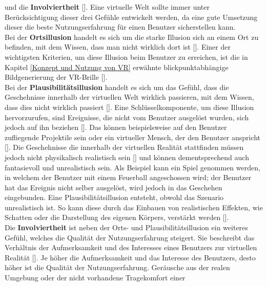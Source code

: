 \documentclass[a4paper,12pt,oneside]{article}
\begin{document}
        und die \textbf{Involviertheit} [\cite[18-19]{Dorner2013}]. Eine virtuelle Welt sollte immer unter
        Berücksichtigung dieser drei Gefühle entwickelt werden, da eine gute Umsetzung
        dieser die beste Nutzungserfahrung für einen Benutzer sicherstellen kann. \\
        Bei der 
        \textbf{Ortsillusion} handelt es sich um die starke Illusion sich an einem Ort zu befinden, 
        mit dem Wissen, dass man nicht wirklich dort ist [\cite{Slater2009}]. 
        Einer der wichtigsten
        Kriterien, um diese Illusion beim Benutzer zu erreichen, ist die in Kapitel 
        \ref{Konzept und Nutzung von VR}
        erwähnte blickpunktabhängige Bildgenerierung der VR-Brille [\cite[18]{Dorner2013}]. \\
        Bei der \textbf{Plausibilitätsillusion} handelt
        es sich um das Gefühl, dass die Geschehnisse innerhalb der virtuellen Welt 
        wirklich passieren, mit dem Wissen, dass dies nicht wirklich passiert
        [\cite{Slater2009}]. Eine Schlüsselkomponente, um diese Illusion hervorzurufen,
        sind Ereignisse, die nicht vom Benutzer ausgelöst wurden, sich jedoch auf ihn
        beziehen [\cite{Slater2009}]. Das können beispielsweise auf den Benutzer zufliegende
        Projektile sein oder ein virtueller Mensch, der den Benutzer anspricht
        [\cite[18-19]{Dorner2013}]. Die Geschehnisse die innerhalb der virtuellen Realität
        stattfinden müssen jedoch nicht physikalisch realistisch sein [\cite{Slater2009}]
        und können dementsprechend auch fantasievoll und unrealistisch sein. Als Beispiel kann
        ein Spiel genommen werden, in welchem der Benutzer mit einem 
        Feuerball angeschossen wird; der Benutzer hat das Ereignis nicht selber ausgelöst,
        wird jedoch in das Geschehen eingebunden. Eine Plausibilitätsillusion entsteht,
        obwohl das Szenario unrealistisch ist. So kann diese durch das
        Einbauen von realistischen Effekten, wie Schatten oder die Darstellung des eigenen
        Körpers, verstärkt werden [\cite{Slater2009}]. \\
        Die \textbf{Involviertheit} ist neben der Orts- und Plausibilitätsillusion ein weiteres
        Gefühl, welches die Qualität der Nutzungserfahrung steigert. Sie
        beschreibt das Verhältnis der Aufmerksamkeit und des Interesses eines Benutzers zur
        virtuellen Realität [\cite[227]{Witmer1998}]. Je höher die Aufmerksamkeit und das
        Interesse des Benutzers, desto höher ist die Qualität der Nutzungserfahrung.
        Geräusche aus der realen Umgebung oder der nicht vorhandene Tragekomfort einer 
\end{document}
